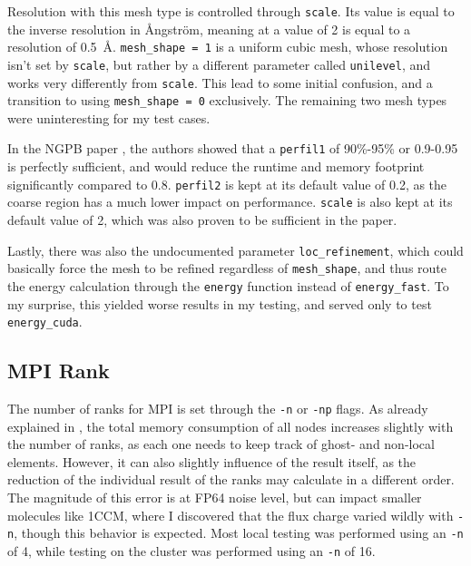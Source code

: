 Resolution with this mesh type is controlled through \texttt{scale}. Its value is equal to the inverse resolution in Ångström, meaning at a value of 2 is equal to a resolution of 0.5 \,\AA{}.
\texttt{mesh\_shape = 1} is a uniform cubic mesh, whose resolution isn't set by \texttt{scale}, but rather by a different parameter called \texttt{unilevel}, and works very differently from \texttt{scale}. This lead to some initial confusion, and a transition to using \texttt{mesh\_shape = 0} exclusively. 
The remaining two mesh types were uninteresting for my test cases.

In the NGPB paper \cite{diflorio2025nextgenpb}, the authors showed that a \texttt{perfil1} of 90\%-95\% or 0.9-0.95 is perfectly sufficient, and would reduce the runtime and memory footprint significantly compared to 0.8. 
\texttt{perfil2} is kept at its default value of 0.2, as the coarse region has a much lower impact on performance. 
\texttt{scale} is also kept at its default value of 2, which was also proven to be sufficient in the paper.

Lastly, there was also the undocumented parameter \texttt{loc\_refinement}, which could basically force the mesh to be refined regardless of \texttt{mesh\_shape}, and thus route the energy calculation through the \texttt{energy} function instead of \texttt{energy\_fast}. To my surprise, this yielded worse results in my testing, and served only to test \texttt{energy\_cuda}.

\subsection{MPI Rank}
\label{sec:evaluation-experimental-setup-mpi-ranks}

The number of ranks for MPI is set through the \texttt{-n} or \texttt{-np} flags. 
As already explained in
, the total memory consumption of all nodes increases slightly with the number of ranks, as each one needs to keep track of ghost- and non-local elements.
However, it can also slightly influence of the result itself, as the reduction of the individual result of the ranks may calculate in a different order. 
The magnitude of this error is at FP64 noise level, but can impact smaller molecules like 1CCM, where I discovered that the flux charge varied wildly with \texttt{-n}, though this behavior is expected. 
Most local testing was performed using an \texttt{-n} of 4, while testing on the cluster was performed using an \texttt{-n} of 16.

